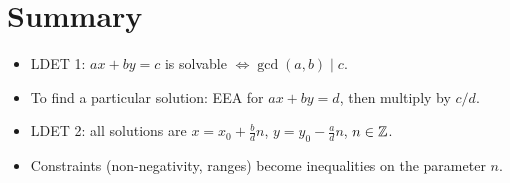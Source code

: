 \section{Summary}
\begin{itemize}
  \item LDET 1: $ax + by = c$ is solvable $\iff \gcd(a,b) \mid c$.
  \item To find a particular solution: EEA for $ax+by = d$, then multiply by $c/d$.
  \item LDET 2: all solutions are $x = x_0 + \frac bd n$, $y = y_0 - \frac ad n$, $n\in\mathbb{Z}$.
  \item Constraints (non-negativity, ranges) become inequalities on the parameter $n$.
\end{itemize}
